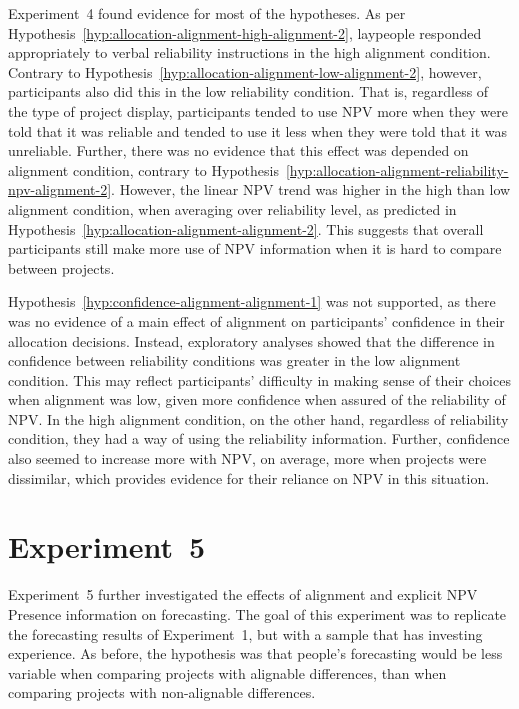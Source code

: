 \documentclass[a4paper, nobind]{templates/ociamthesis}
\theoremstyle{definition}
\theoremstyle{definition}
\theoremstyle{definition}
\theoremstyle{definition}
\theoremstyle{remark}
\begin{document}
Experiment~4 found evidence for most of the hypotheses. As per
Hypothesis~\ref{hyp:allocation-alignment-high-alignment-2}, laypeople responded
appropriately to verbal reliability instructions in the high alignment
condition. Contrary to
Hypothesis~\ref{hyp:allocation-alignment-low-alignment-2}, however,
participants also did this in the low reliability condition. That is, regardless
of the type of project display, participants tended to use NPV more when they
were told that it was reliable and tended to use it less when they were told
that it was unreliable. Further, there was no evidence that this effect was
depended on alignment condition, contrary to
Hypothesis~\ref{hyp:allocation-alignment-reliability-npv-alignment-2}. However,
the linear NPV trend was higher in the high than low alignment condition,
when averaging over reliability level, as predicted in
Hypothesis~\ref{hyp:allocation-alignment-alignment-2}. This suggests that
overall participants still make more use of NPV information when it is hard to
compare between projects.

Hypothesis~\ref{hyp:confidence-alignment-alignment-1} was not supported, as
there was no evidence of a main effect of alignment on participants' confidence
in their allocation decisions. Instead, exploratory analyses showed that the
difference in confidence between reliability conditions was greater in the low
alignment condition. This may reflect participants' difficulty in making sense
of their choices when alignment was low, given more confidence when assured of
the reliability of NPV. In the high alignment condition, on the other hand,
regardless of reliability condition, they had a way of using the reliability
information. Further, confidence also seemed to increase more with NPV, on
average, more when projects were dissimilar, which provides evidence for their
reliance on NPV in this situation.

\hypertarget{alignment-4}{%
\section{Experiment~5}\label{alignment-4}}

Experiment~5 further investigated the effects of alignment and explicit NPV
Presence information on forecasting. The goal of this experiment was to
replicate the forecasting results of Experiment~1, but with a sample that has
investing experience. As before, the hypothesis was that people's forecasting
would be less variable when comparing projects with alignable differences, than
when comparing projects with non-alignable differences.
\end{document}
